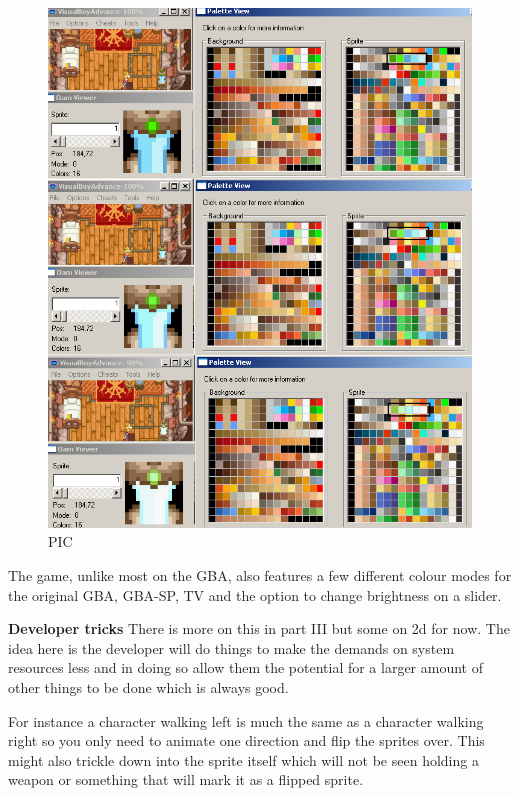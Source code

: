 \documentclass[
]{book}
\begin{document}
\begin{figure}
\centering
\includegraphics{images/53_home_fast6191_romhackingguide_unrenamed_file___rs_romhackingguidegraphicspaletteanimation1.png}
\caption{PIC}
\end{figure}

The game, unlike most on the GBA, also features a few different colour modes for the original GBA, GBA-SP, TV and the option to change brightness on a slider.

\textbf{Developer tricks} There is more on this in part III but some on 2d for now. The idea here is the developer will do things to make the demands on system resources less and in doing so allow them the potential for a larger amount of other things to be done which is always good.

For instance a character walking left is much the same as a character walking right so you only need to animate one direction and flip the sprites over. This might also trickle down into the sprite itself which will not be seen holding a weapon or something that will mark it as a flipped sprite.
\end{document}
